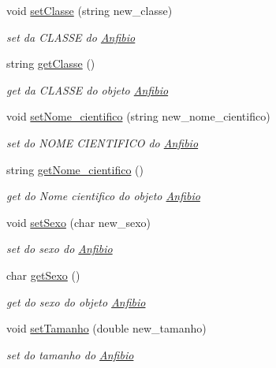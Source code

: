 \begin{DoxyCompactItemize}
void \mbox{\hyperlink{class_anfibio_a7bc9968ef3513b1ecb09a16297be0c9a}{set\+Classe}} (string new\+\_\+classe)
\begin{DoxyCompactList}\small\item\em set da C\+L\+A\+S\+SE do \mbox{\hyperlink{class_anfibio}{Anfibio}} \end{DoxyCompactList}\item 
string \mbox{\hyperlink{class_anfibio_a9b792c2cf3a073a306c6d20f89c6c614}{get\+Classe}} ()
\begin{DoxyCompactList}\small\item\em get da C\+L\+A\+S\+SE do objeto \mbox{\hyperlink{class_anfibio}{Anfibio}} \end{DoxyCompactList}\item 
void \mbox{\hyperlink{class_anfibio_aa9eeaec2d983364de0976647918dea21}{set\+Nome\+\_\+cientifico}} (string new\+\_\+nome\+\_\+cientifico)
\begin{DoxyCompactList}\small\item\em set do N\+O\+ME C\+I\+E\+N\+T\+I\+F\+I\+CO do \mbox{\hyperlink{class_anfibio}{Anfibio}} \end{DoxyCompactList}\item 
string \mbox{\hyperlink{class_anfibio_a92ab6f59134b33955c84d2cc079be488}{get\+Nome\+\_\+cientifico}} ()
\begin{DoxyCompactList}\small\item\em get do Nome cientifico do objeto \mbox{\hyperlink{class_anfibio}{Anfibio}} \end{DoxyCompactList}\item 
void \mbox{\hyperlink{class_anfibio_aa69452680e389f817fe2d9761c6322f4}{set\+Sexo}} (char new\+\_\+sexo)
\begin{DoxyCompactList}\small\item\em set do sexo do \mbox{\hyperlink{class_anfibio}{Anfibio}} \end{DoxyCompactList}\item 
char \mbox{\hyperlink{class_anfibio_af43db7375d863acb8832549f513f57ec}{get\+Sexo}} ()
\begin{DoxyCompactList}\small\item\em get do sexo do objeto \mbox{\hyperlink{class_anfibio}{Anfibio}} \end{DoxyCompactList}\item 
void \mbox{\hyperlink{class_anfibio_a670cf19d6d6423bdf1cac6bcbea97354}{set\+Tamanho}} (double new\+\_\+tamanho)
\begin{DoxyCompactList}\small\item\em set do tamanho do \mbox{\hyperlink{class_anfibio}{Anfibio}} \end{DoxyCompactList}\item 

\end{DoxyCompactItemize}
